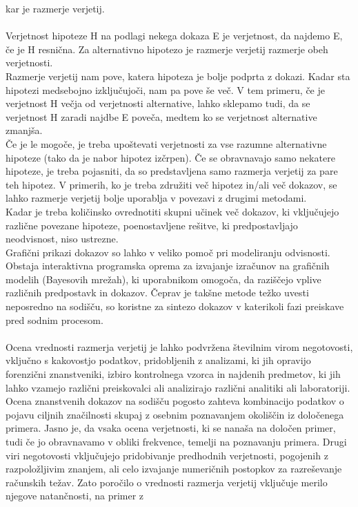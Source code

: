 \documentclass[fin1, tisk]{fmfdelo}
\theoremstyle{definition}
\theoremstyle{trditev}
\theoremstyle{izrek}
\begin{document}
kar je razmerje verjetij.\\\\
Verjetnost hipoteze H na podlagi nekega dokaza E je verjetnost, da najdemo E, če je H resnična. Za alternativno hipotezo je razmerje verjetij razmerje obeh
verjetnosti.\\
Razmerje verjetij nam pove, katera hipoteza je bolje podprta z dokazi. Kadar sta hipotezi medsebojno izključujoči, nam pa pove še več.
V tem primeru, če je verjetnost H večja od verjetnosti alternative, lahko sklepamo tudi, da se verjetnost H zaradi najdbe E poveča, medtem ko se
verjetnost alternative zmanjša. \\
Če je le mogoče, je treba upoštevati verjetnosti za vse razumne alternativne hipoteze (tako da je nabor hipotez izčrpen). Če se obravnavajo samo 
nekatere hipoteze, je treba pojasniti, da so predstavljena samo razmerja verjetij za pare teh hipotez. V primerih, ko je treba
združiti več hipotez in/ali več dokazov, se lahko razmerje verjetij bolje uporablja v povezavi z drugimi metodami.\\
Kadar je treba količinsko ovrednotiti skupni učinek več dokazov, ki vključujejo različne povezane hipoteze, poenostavljene rešitve, ki predpostavljajo 
neodvisnost, niso ustrezne.\\
Grafični prikazi dokazov so lahko v veliko pomoč pri modeliranju odvisnosti. Obstaja interaktivna programska oprema za izvajanje izračunov na 
grafičnih modelih (Bayesovih mrežah), ki uporabnikom omogoča, da raziščejo vplive različnih predpostavk in dokazov. Čeprav je takšne metode 
težko uvesti neposredno na sodišču, so koristne za sintezo dokazov v katerikoli fazi preiskave pred sodnim procesom.\\\\
Ocena vrednosti razmerja verjetij je lahko podvržena številnim virom negotovosti, vključno s kakovostjo podatkov, pridobljenih z analizami, ki jih
opravijo forenzični znanstveniki, izbiro kontrolnega vzorca in najdenih predmetov, ki jih lahko vzamejo različni preiskovalci ali analizirajo različni
analitiki ali laboratoriji. Ocena znanstvenih dokazov na sodišču pogosto zahteva kombinacijo podatkov o pojavu ciljnih značilnosti skupaj z osebnim poznavanjem
okoliščin iz določenega primera. Jasno je, da vsaka ocena verjetnosti, ki se nanaša na določen primer, tudi če jo obravnavamo v obliki frekvence, temelji 
na poznavanju primera. Drugi viri negotovosti vključujejo pridobivanje predhodnih verjetnosti, pogojenih z razpoložljivim znanjem, ali celo
izvajanje numeričnih postopkov za razreševanje računskih težav. Zato poročilo o vrednosti razmerja verjetij vključuje merilo njegove natančnosti, na primer z
\end{document}
